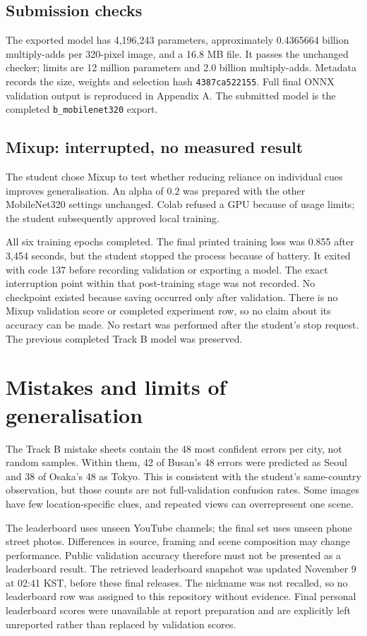 \documentclass[11pt]{article}
\begin{document}
\subsection*{Submission checks}
The exported model has 4,196,243 parameters, approximately 0.4365664 billion multiply-adds per 320-pixel image, and a 16.8 MB file. It passes the unchanged checker; limits are 12 million parameters and 2.0 billion multiply-adds. Metadata records the size, weights and selection hash \texttt{4387ca522155}. Full final ONNX validation output is reproduced in Appendix A. The submitted model is the completed \texttt{b\_mobilenet320} export.

\subsection*{Mixup: interrupted, no measured result}
The student chose Mixup to test whether reducing reliance on individual cues improves generalisation. An alpha of 0.2 was prepared with the other MobileNet320 settings unchanged. Colab refused a GPU because of usage limits; the student subsequently approved local training.

All six training epochs completed. The final printed training loss was 0.855 after 3,454 seconds, but the student stopped the process because of battery. It exited with code 137 before recording validation or exporting a model. The exact interruption point within that post-training stage was not recorded. No checkpoint existed because saving occurred only after validation. There is no Mixup validation score or completed experiment row, so no claim about its accuracy can be made. No restart was performed after the student's stop request. The previous completed Track B model was preserved.

\section*{Mistakes and limits of generalisation}
The Track B mistake sheets contain the 48 most confident errors per city, not random samples. Within them, 42 of Busan's 48 errors were predicted as Seoul and 38 of Osaka's 48 as Tokyo. This is consistent with the student's same-country observation, but those counts are not full-validation confusion rates. Some images have few location-specific clues, and repeated views can overrepresent one scene.

The leaderboard uses unseen YouTube channels; the final set uses unseen phone street photos. Differences in source, framing and scene composition may change performance. Public validation accuracy therefore must not be presented as a leaderboard result. The retrieved leaderboard snapshot was updated November 9 at 02:41 KST, before these final releases. The nickname was not recalled, so no leaderboard row was assigned to this repository without evidence. Final personal leaderboard scores were unavailable at report preparation and are explicitly left unreported rather than replaced by validation scores.
\end{document}
